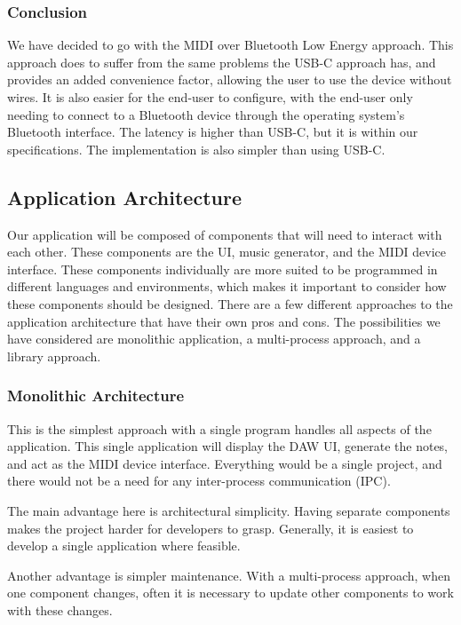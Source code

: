 \subsubsection{Conclusion}

We have decided to go with the MIDI over Bluetooth Low Energy approach. This approach does
to suffer from the same problems the USB-C approach has, and provides an added convenience
factor, allowing the user to use the device without wires. It is also easier for the
end-user to configure, with the end-user only needing to connect to a Bluetooth device
through the operating system's Bluetooth interface. The latency is higher than USB-C, but
it is within our specifications. The implementation is also simpler than using USB-C.

\subsection{Application Architecture}
\label{sec:app_architecture}

Our application will be composed of components that will need to interact with each other.
These components are the UI, music generator, and the MIDI device interface. These
components individually are more suited to be programmed in different languages and
environments, which makes it important to consider how these components should be
designed. There are a few different approaches to the application architecture that have
their own pros and cons. The possibilities we have considered are monolithic application,
a multi-process approach, and a library approach.

\subsubsection{Monolithic Architecture}

This is the simplest approach with a single program handles all aspects of the
application. This single application will display the DAW UI, generate the notes, and act
as the MIDI device interface. Everything would be a single project, and there would not be
a need for any inter-process communication (IPC).

The main advantage here is architectural simplicity. Having separate components makes the
project harder for developers to grasp. Generally, it is easiest to develop a single
application where feasible.

Another advantage is simpler maintenance. With a multi-process approach, when one
component changes, often it is necessary to update other components to work with these
changes.

